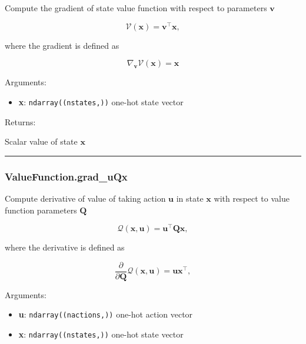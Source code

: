 Compute the gradient of state value function with respect to parameters
\(\mathbf v\)

\[
\mathcal V(\mathbf x) = \mathbf v^\top \mathbf x,
\]

where the gradient is defined as

\[
\nabla_{\mathbf v} \mathcal V(\mathbf x) = \mathbf x
\]

Arguments:

\begin{itemize}
\tightlist
\item
  \textbf{x}: \texttt{ndarray((nstates,))} one-hot state vector
\end{itemize}

Returns:

Scalar value of state \(\mathbf x\)

\begin{center}\rule{0.5\linewidth}{\linethickness}\end{center}

\subsubsection{ValueFunction.grad\_uQx}\label{valuefunction.grad_uqx}

\begin{Shaded}
\begin{Highlighting}[]
\end{Highlighting}
\end{Shaded}

Compute derivative of value of taking action \(\mathbf u\) in state
\(\mathbf x\) with respect to value function parameters \(\mathbf Q\)

\[
\mathcal Q(\mathbf x, \mathbf u) = \mathbf u^\top \mathbf Q \mathbf x,
\]

where the derivative is defined as

\[
\frac{\partial}{\partial \mathbf Q} \mathcal Q(\mathbf x, \mathbf u) = \mathbf u \mathbf x^\top,
\]

Arguments:

\begin{itemize}
\tightlist
\item
  \textbf{u}: \texttt{ndarray((nactions,))} one-hot action vector
\item
  \textbf{x}: \texttt{ndarray((nstates,))} one-hot state vector
\end{itemize}

